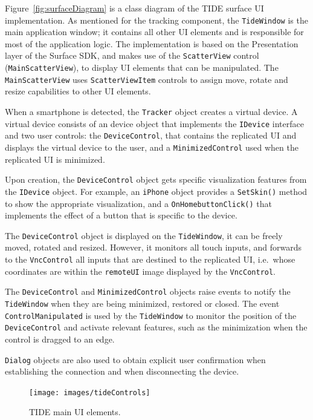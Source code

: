 Figure~\ref{fig:surfaceDiagram} is a class diagram of the TIDE surface UI implementation.
As mentioned for the tracking component, the \texttt{TideWindow} is the main application window; it contains all other UI elements and is responsible for most of the application logic.
The implementation is based on the Presentation layer of the Surface SDK, and makes use of the \texttt{ScatterView} control (\texttt{MainScatterView}), to display UI elements that can be manipulated.
The \texttt{MainScatterView} uses \texttt{ScatterViewItem} controls to assign move, rotate and resize capabilities to other UI elements.

When a smartphone is detected, the \texttt{Tracker} object creates a virtual device.
A virtual device consists of an device object that implements the \texttt{IDevice} interface and two user controls: the \texttt{DeviceControl}, that contains the replicated UI and displays the virtual device to the user, and a \texttt{MinimizedControl} used when the replicated UI is minimized.

Upon creation, the \texttt{DeviceControl} object gets specific visualization features from the \texttt{IDevice} object.
For example, an \texttt{iPhone} object provides a \texttt{SetSkin()} method to show the appropriate visualization, and a \texttt{OnHomebuttonClick()} that implements the effect of a button that is specific to the device.

The \texttt{DeviceControl} object is displayed on the \texttt{TideWindow}, it can be freely moved, rotated and resized.
However, it monitors all touch inputs, and forwards to the \texttt{VncControl} all inputs that are destined to the replicated UI, i.e.\ whose coordinates are within the \texttt{remoteUI} image displayed by the \texttt{VncControl}.

The \texttt{DeviceControl} and \texttt{MinimizedControl} objects raise events to notify the \texttt{TideWindow} when they are being minimized, restored or closed.
The event \texttt{ControlManipulated} is used by the \texttt{TideWindow} to monitor the position of the \texttt{DeviceControl} and activate relevant features, such as the minimization when the control is dragged to an edge.

\texttt{Dialog} objects are also used to obtain explicit user confirmation when establishing the connection and when disconnecting the device.

\begin{figure}[htb]
  \centering
    \texttt{[image: images/tideControls]}
    \caption{TIDE main UI elements.}
    \label{fig:tideControls}
\end{figure}

